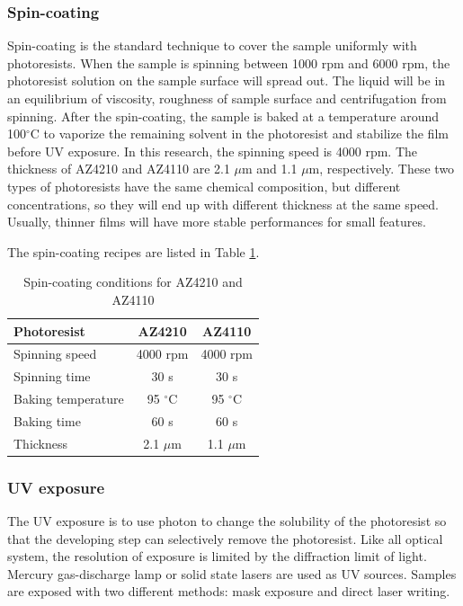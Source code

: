 \documentclass[pdflatex, sectionletters, 12pt]{pittetd}    %
\begin{document}
\subsubsection{Spin-coating}

 Spin-coating is the standard technique to cover the sample uniformly with photoresists. When the sample is spinning between 1000 rpm and 6000 rpm, the photoresist solution on the sample surface will spread out. The liquid will be in an equilibrium of viscosity, roughness of sample surface and centrifugation from spinning. After the spin-coating, the sample is baked at a temperature around 100$^{\circ}$C to vaporize the remaining solvent in the photoresist and stabilize the film before UV exposure. In this research, the spinning speed is 4000 rpm. The thickness of AZ4210 and AZ4110 are 2.1 $\mu$m and 1.1 $\mu$m, respectively. These two types of photoresists have the same chemical composition, but different concentrations, so they will end up with different thickness at the same speed. Usually, thinner films will have more stable performances for small features.

The spin-coating recipes are listed in Table \ref{TAB:photoresistsCoating}.

\begin{table}
	\centering
	\begin{tabular}{l|cc}
		\hline
		Photoresist    &    AZ4210    &    AZ4110 \\ \hline
		Spinning speed    &    4000 rpm    & 4000 rpm    \\ 
		Spinning time    &    30 s    &    30 s    \\
		Baking temperature    &    95 $^{\circ}$C    &    95 $^{\circ}$C \\ 
		Baking time    &    60 s    &    60 s    \\
		Thickness    &    2.1 $\mu$m    &    1.1 $\mu$m \\ \hline
	\end{tabular}
	\caption{Spin-coating conditions for AZ4210 and AZ4110}
	\label{TAB:photoresistsCoating}
	
\end{table}

\subsubsection{UV exposure}

The UV exposure is to use photon to change the solubility of the photoresist so that the developing step can selectively remove the photoresist. Like all optical system, the resolution of exposure is limited by the diffraction limit of light. Mercury gas-discharge lamp or solid state lasers are used as UV sources. Samples are exposed with two different methods: mask exposure and direct laser writing. 
\end{document}
